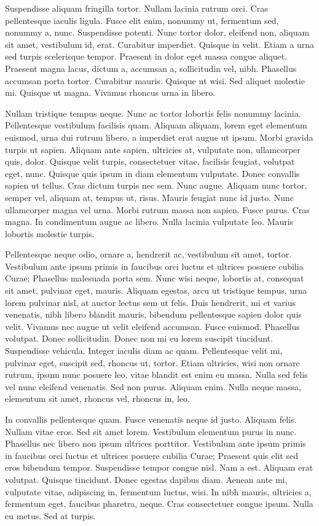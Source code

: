 \documentclass[a4paper,11pt]{kth-mag}
\begin{document}
Suspendisse aliquam fringilla tortor. Nullam lacinia rutrum orci. Cras
pellentesque iaculis ligula. Fusce elit enim, nonummy ut, fermentum
sed, nonummy a, nunc. Suspendisse potenti. Nunc tortor dolor, eleifend
non, aliquam sit amet, vestibulum id, erat. Curabitur imperdiet.
Quisque in velit. Etiam a urna sed turpis scelerisque tempor. Praesent
in dolor eget massa congue aliquet. Praesent magna lacus, dictum a,
accumsan a, sollicitudin vel, nibh. Phasellus accumsan porta tortor.
Curabitur mauris. Quisque ut wisi. Sed aliquet molestie mi. Quisque ut
magna. Vivamus rhoncus urna in libero.

Nullam tristique tempus neque. Nunc ac tortor lobortis felis nonummy
lacinia. Pellentesque vestibulum facilisis quam. Aliquam aliquam,
lorem eget elementum euismod, urna dui rutrum libero, a imperdiet erat
augue ut ipsum. Morbi gravida turpis ut sapien. Aliquam ante sapien,
ultricies at, vulputate non, ullamcorper quis, dolor. Quisque velit
turpis, consectetuer vitae, facilisis feugiat, volutpat eget, nunc.
Quisque quis ipsum in diam elementum vulputate. Donec convallis sapien
ut tellus. Cras dictum turpis nec sem. Nunc augue. Aliquam nunc
tortor, semper vel, aliquam at, tempus ut, risus. Mauris feugiat nunc
id justo. Nunc ullamcorper magna vel urna. Morbi rutrum massa non
sapien. Fusce purus. Cras magna. In condimentum augue ac libero. Nulla
lacinia vulputate leo. Mauris lobortis molestie turpis.

Pellentesque neque odio, ornare a, hendrerit ac, vestibulum sit amet,
tortor. Vestibulum ante ipsum primis in faucibus orci luctus et
ultrices posuere cubilia Curae; Phasellus malesuada porta sem. Nunc
wisi neque, lobortis at, consequat sit amet, pulvinar eget, mauris.
Aliquam egestas, arcu ut tristique tempus, urna lorem pulvinar nisl,
at auctor lectus sem ut felis. Duis hendrerit, mi et varius venenatis,
nibh libero blandit mauris, bibendum pellentesque sapien dolor quis
velit. Vivamus nec augue ut velit eleifend accumsan. Fusce euismod.
Phasellus volutpat. Donec sollicitudin. Donec non mi eu lorem suscipit
tincidunt. Suspendisse vehicula. Integer iaculis diam ac quam.
Pellentesque velit mi, pulvinar eget, suscipit sed, rhoncus ut,
tortor. Etiam ultricies, wisi non ornare rutrum, ipsum nunc posuere
leo, vitae blandit est enim eu massa. Nulla sed felis vel nunc
eleifend venenatis. Sed non purus. Aliquam enim. Nulla neque massa,
elementum sit amet, rhoncus vel, rhoncus in, leo.

In convallis pellentesque quam. Fusce venenatis neque id justo.
Aliquam felis. Nullam vitae eros. Sed sit amet lorem. Vestibulum
elementum purus in nunc. Phasellus nec libero non ipsum ultrices
porttitor. Vestibulum ante ipsum primis in faucibus orci luctus et
ultrices posuere cubilia Curae; Praesent quis elit sed eros bibendum
tempor. Suspendisse tempor congue nisl. Nam a est. Aliquam erat
volutpat. Quisque tincidunt. Donec egestas dapibus diam. Aenean ante
mi, vulputate vitae, adipiscing in, fermentum luctus, wisi. In nibh
mauris, ultricies a, fermentum eget, faucibus pharetra, neque. Cras
consectetuer congue ipsum. Nulla eu metus. Sed at turpis.
\end{document}
